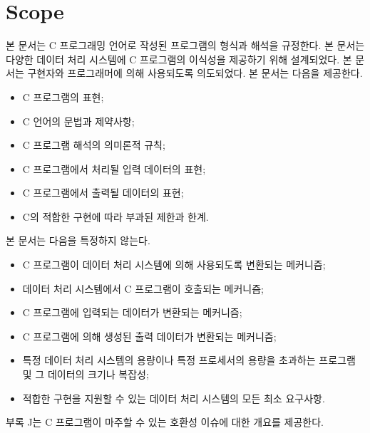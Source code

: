 \section{Scope}

\pnumauto
본 문서는 C 프로그래밍 언어로 작성된 프로그램의 형식과 해석을 규정한다. 
본 문서는 다양한 데이터 처리 시스템에 C 프로그램의 이식성을 제공하기 위해 설계되었다. 
본 문서는 구현자와 프로그래머에 의해 사용되도록 의도되었다.
본 문서는 다음을 제공한다.
\begin{itemize}[label={—}] %
    \item C 프로그램의 표현;
    \item C 언어의 문법과 제약사항;
    \item C 프로그램 해석의 의미론적 규칙;
    \item C 프로그램에서 처리될 입력 데이터의 표현;
    \item C 프로그램에서 출력될 데이터의 표현;
    \item C의 적합한 구현에 따라 부과된 제한과 한계.
\end{itemize}

\pnumauto
본 문서는 다음을 특정하지 않는다.
\begin{itemize}[label={—}]
    \item C 프로그램이 데이터 처리 시스템에 의해 사용되도록 변환되는 메커니즘;
    \item 데이터 처리 시스템에서 C 프로그램이 호출되는 메커니즘;
    \item C 프로그램에 입력되는 데이터가 변환되는 메커니즘;
    \item C 프로그램에 의해 생성된 출력 데이터가 변환되는 메커니즘;
    \item 특정 데이터 처리 시스템의 용량이나 특정 프로세서의 용량을 초과하는 프로그램 및 그 데이터의 크기나 복잡성;
    \item 적합한 구현을 지원할 수 있는 데이터 처리 시스템의 모든 최소 요구사항.
\end{itemize}

\pnumauto   
부록 J는 C 프로그램이 마주할 수 있는 호환성 이슈에 대한 개요를 제공한다.